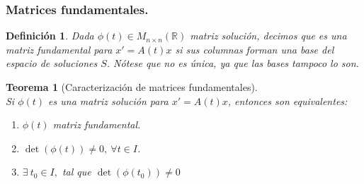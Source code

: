 \documentclass{article}
\theoremstyle{theorem-style}  %
\newtheorem{theorem}{Teorema}[section]  %
\theoremstyle{definition-style}
\newtheorem{definition}{Definición}[section]
\theoremstyle{example-style}
\begin{document}
\subsubsection{Matrices fundamentales.}
\begin{definition}
	Dada $ \phi(t)\in M_{n\times n}(\mathbb{R}) $ matriz solución, decimos que es una \emph{matriz fundamental} para $ x'=A(t)x $ si sus columnas forman una base del espacio de soluciones $ S $. Nótese que no es única, ya que las bases tampoco lo son.
\end{definition}
\begin{theorem}[Caracterización de matrices fundamentales]\label{matfund-carac}\ \\
	Si $ \phi(t) $ es una matriz solución para $ x'=A(t)x $, entonces son equivalentes:
	\begin{enumerate}[\quad i)]
		\item $ \phi(t)$ matriz fundamental.
		\item $ \det(\phi(t))\neq 0, \ \forall t \in I $.
		\item $ \exists \ t_0 \in I,$ tal que $ \det(\phi(t_0))\neq 0 $
	\end{enumerate}
\end{theorem}
\end{document}
